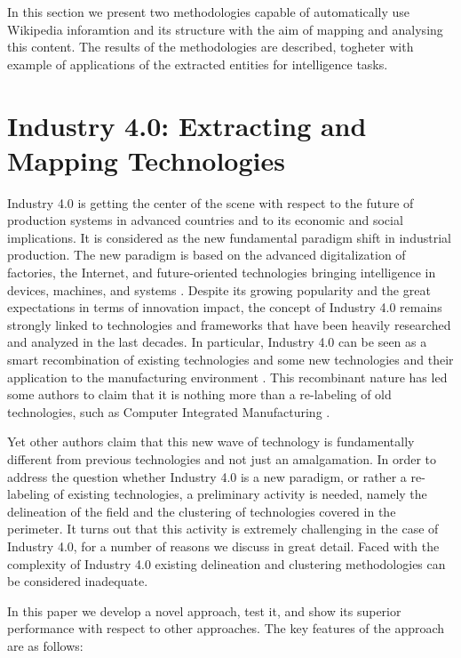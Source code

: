 \documentclass[]{book}
\begin{document}
In this section we present two methodologies capable of automatically
use Wikipedia inforamtion and its structure with the aim of mapping and
analysing this content. The results of the methodologies are described,
togheter with example of applications of the extracted entities for
intelligence tasks.

\section{Industry 4.0: Extracting and Mapping
Technologies}\label{technimetrochap}

Industry 4.0 is getting the center of the scene with respect to the
future of production systems in advanced countries and to its economic
and social implications. It is considered as the new fundamental
paradigm shift in industrial production. The new paradigm is based on
the advanced digitalization of factories, the Internet, and
future-oriented technologies bringing intelligence in devices, machines,
and systems \citep{lasi2014industry}. Despite its growing popularity and
the great expectations in terms of innovation impact, the concept of
Industry 4.0 remains strongly linked to technologies and frameworks that
have been heavily researched and analyzed in the last decades. In
particular, Industry 4.0 can be seen as a smart recombination of
existing technologies and some new technologies and their application to
the manufacturing environment \citep{trappey2016review}. This
recombinant nature has led some authors to claim that it is nothing more
than a re-labeling of old technologies, such as Computer Integrated
Manufacturing \citep{apreda2016functional}.

Yet other authors claim that this new wave of technology is
fundamentally different from previous technologies and not just an
amalgamation. In order to address the question whether Industry 4.0 is a
new paradigm, or rather a re-labeling of existing technologies, a
preliminary activity is needed, namely the delineation of the field and
the clustering of technologies covered in the perimeter. It turns out
that this activity is extremely challenging in the case of Industry 4.0,
for a number of reasons we discuss in great detail. Faced with the
complexity of Industry 4.0 existing delineation and clustering
methodologies can be considered inadequate.

In this paper we develop a novel approach, test it, and show its
superior performance with respect to other approaches. The key features
of the approach are as follows:
\end{document}
